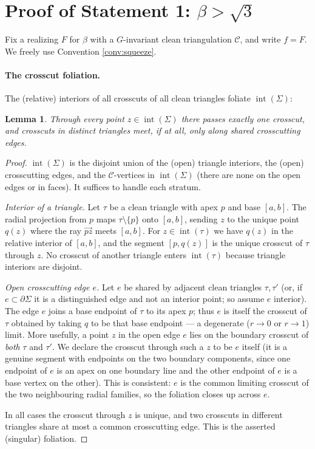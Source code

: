 \documentclass[12pt]{article}
\newtheorem{lemma}[theorem]{Lemma}
\newcommand{\Sig}{\Sigma}
\DeclareMathOperator{\interior}{int}
\begin{document}
\section{Proof of Statement 1: $\beta>\sqrt3$}
\label{sec:S1}

Fix a realizing $F$ for $\beta$ with a $G$-invariant clean triangulation
$\mathcal C$, and write $f=F$. We freely use Convention
\ref{conv:squeeze}.

\paragraph{The crosscut foliation.}
The (relative) interiors of all crosscuts of all clean triangles foliate
$\interior(\Sig)$:

\begin{lemma}\label{lem:foliation}
Through every point $z\in\interior(\Sig)$ there passes exactly one
crosscut, and crosscuts in distinct triangles meet, if at all, only along
shared crosscutting edges.
\end{lemma}

\begin{proof}
$\interior(\Sig)$ is the disjoint union of the (open) triangle interiors,
the (open) crosscutting edges, and the $\mathcal C$-vertices in
$\interior(\Sig)$ (there are none on the open edges or in faces). It
suffices to handle each stratum.

\emph{Interior of a triangle.} Let $\tau$ be a clean triangle with apex
$p$ and base $[a,b]$. The radial projection from $p$ maps
$\tau\setminus\{p\}$ onto $[a,b]$, sending $z$ to the unique point
$q(z)$ where the ray $\overrightarrow{pz}$ meets $[a,b]$. For
$z\in\interior(\tau)$ we have $q(z)$ in the relative interior of $[a,b]$,
and the segment $[p,q(z)]$ is the unique crosscut of $\tau$ through $z$.
No crosscut of another triangle enters $\interior(\tau)$ because triangle
interiors are disjoint.

\emph{Open crosscutting edge $e$.} Let $e$ be shared by adjacent clean
triangles $\tau,\tau'$ (or, if $e\subset\partial\Sig$ it is a
distinguished edge and not an interior point; so assume $e$ interior).
The edge $e$ joins a base endpoint of $\tau$ to its apex $p$; thus $e$
is itself the crosscut of $\tau$ obtained by taking $q$ to be that base
endpoint --- a degenerate ($r\to0$ or $r\to1$) limit. More usefully, a
point $z$ in the open edge $e$ lies on the boundary crosscut of
\emph{both} $\tau$ and $\tau'$. We declare the crosscut through such a
$z$ to be $e$ itself (it is a genuine segment with endpoints on the two
boundary components, since one endpoint of $e$ is an apex on one boundary
line and the other endpoint of $e$ is a base vertex on the other). This
is consistent: $e$ is the common limiting crosscut of the two
neighbouring radial families, so the foliation closes up across $e$.

In all cases the crosscut through $z$ is unique, and two crosscuts in
different triangles share at most a common crosscutting edge. This is the
asserted (singular) foliation.
\end{proof}
\end{document}
